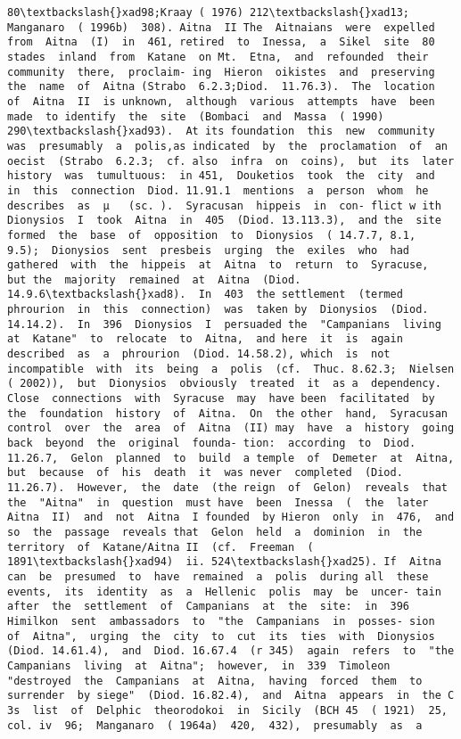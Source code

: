 \documentclass[11pt]{article}
\begin{document}
\begin{Verbatim}[commandchars=\\\{\}]
80\textbackslash{}xad98;Kraay ( 1976) 212\textbackslash{}xad13;  Manganaro  ( 1996b)  308). Aitna  II The  Aitnaians  were  expelled  from  Aitna  (I)  in  461, retired  to  Inessa,  a  Sikel  site  80  stades  inland  from  Katane  on Mt.  Etna,  and  refounded  their  community  there,  proclaim- ing  Hieron  oikistes  and  preserving  the  name  of  Aitna (Strabo  6.2.3;Diod.  11.76.3).  The  location  of  Aitna  II  is unknown,  although  various  attempts  have  been  made  to identify  the  site  (Bombaci  and  Massa  ( 1990)  290\textbackslash{}xad93).  At its foundation  this  new  community  was  presumably  a  polis,as indicated  by  the  proclamation  of  an  oecist  (Strabo  6.2.3;  cf. also  infra  on  coins),  but  its  later  history  was  tumultuous:  in 451,  Douketios  took  the  city  and  in  this  connection  Diod. 11.91.1  mentions  a  person  whom  he  describes  as  µ   (sc. ).  Syracusan  hippeis  in  con- flict w ith  Dionysios  I  took  Aitna  in  405  (Diod. 13.113.3),  and the  site  formed  the  base  of  opposition  to  Dionysios  ( 14.7.7, 8.1,  9.5);  Dionysios  sent  presbeis  urging  the  exiles  who  had gathered  with  the  hippeis  at  Aitna  to  return  to  Syracuse,  but the  majority  remained  at  Aitna  (Diod. 14.9.6\textbackslash{}xad8).  In  403  the settlement  (termed  phrourion  in  this  connection)  was  taken by  Dionysios  (Diod. 14.14.2).  In  396  Dionysios  I  persuaded the  "Campanians  living  at  Katane"  to  relocate  to  Aitna,  and here  it  is  again  described  as  a  phrourion  (Diod. 14.58.2), which  is  not  incompatible  with  its  being  a  polis  (cf.  Thuc. 8.62.3;  Nielsen  ( 2002)),  but  Dionysios  obviously  treated  it  as a  dependency.  Close  connections  with  Syracuse  may  have been  facilitated  by  the  foundation  history  of  Aitna.  On  the other  hand,  Syracusan  control  over  the  area  of  Aitna  (II) may  have  a  history  going  back  beyond  the  original  founda- tion:  according  to  Diod. 11.26.7,  Gelon  planned  to  build  a temple  of  Demeter  at  Aitna,  but  because  of  his  death  it  was never  completed  (Diod. 11.26.7).  However,  the  date  (the reign  of  Gelon)  reveals  that  the  "Aitna"  in  question  must have  been  Inessa  (  the  later  Aitna  II)  and  not  Aitna  I founded  by Hieron  only  in  476,  and  so  the  passage  reveals that  Gelon  held  a  dominion  in  the  territory  of  Katane/Aitna II  (cf.  Freeman  ( 1891\textbackslash{}xad94)  ii. 524\textbackslash{}xad25). If  Aitna  can  be  presumed  to  have  remained  a  polis  during all  these  events,  its  identity  as  a  Hellenic  polis  may  be  uncer- tain  after  the  settlement  of  Campanians  at  the  site:  in  396 Himilkon  sent  ambassadors  to  "the  Campanians  in  posses- sion  of  Aitna",  urging  the  city  to  cut  its  ties  with  Dionysios (Diod. 14.61.4),  and  Diod. 16.67.4  (r 345)  again  refers  to  "the Campanians  living  at  Aitna";  however,  in  339  Timoleon "destroyed  the  Campanians  at  Aitna,  having  forced  them  to surrender  by siege"  (Diod. 16.82.4),  and  Aitna  appears  in  the C 3s  list  of  Delphic  theorodokoi  in  Sicily  (BCH 45  ( 1921)  25, col. iv  96;  Manganaro  ( 1964a)  420,  432),  presumably  as  a 
\end{Verbatim}
\end{document}
